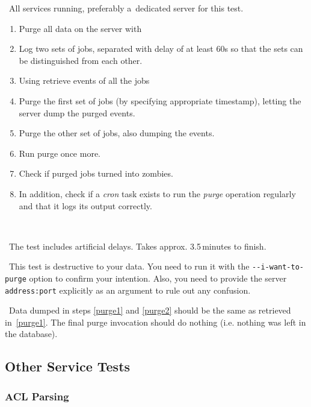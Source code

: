 \req\ All \LB services running, preferably a~dedicated server for this test.

\what
\begin{enumerate}
\item Purge all data on the server with 
\item Log two sets of jobs, separated with delay of at least 60s so
that the sets can be distinguished from each other.
\item \label{purge1}
Using  retrieve events of all the jobs
\item \label{purge2}
Purge the first set of jobs (by specifying appropriate timestamp),
letting the server dump the purged events.
\item \label{purge3} Purge the other set of jobs, also dumping the events.
\item \label{purge4} Run purge once more.
\item Check if purged jobs turned into zombies.
\item In addition, check if a \emph{cron} task exists to run the \emph{purge} operation regularly and that it logs its output correctly.
\end{enumerate}

\how\ 

\note\ The test includes artificial delays. Takes approx. 3.5\,minutes to finish.

\note\ This test is destructive to your data. You need to run it with the \texttt{-{}-i-want-to-purge} option to confirm your intention. Also, you need to provide the \LB server \texttt{address:port} explicitly as an argument to rule out any confusion. 

\result\ Data dumped in steps \ref{purge1} and \ref{purge2} should be the
same as retrieved in~\ref{purge1}. The final purge invocation should
do nothing (i.e. nothing was left in the database).


\subsection{Other Service Tests}

\subsubsection{ACL Parsing}

